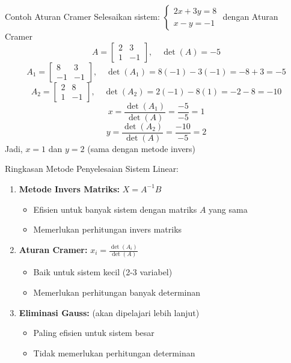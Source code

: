 \documentclass{beamer}
\begin{document}
\begin{frame}[t,fragile]{Contoh Aturan Cramer}
Selesaikan sistem: $\begin{cases} 2x + 3y = 8 \\ x - y = -1 \end{cases}$ dengan Aturan Cramer
\vspace{0.2cm}
$$ A = \begin{bmatrix} 2 & 3 \\ 1 & -1 \end{bmatrix}, \quad \det(A) = -5 $$
$$ A_1 = \begin{bmatrix} 8 & 3 \\ -1 & -1 \end{bmatrix}, \quad \det(A_1) = 8(-1) - 3(-1) = -8 + 3 = -5 $$
$$ A_2 = \begin{bmatrix} 2 & 8 \\ 1 & -1 \end{bmatrix}, \quad \det(A_2) = 2(-1) - 8(1) = -2 - 8 = -10 $$
$$ x = \frac{\det(A_1)}{\det(A)} = \frac{-5}{-5} = 1 $$
$$ y = \frac{\det(A_2)}{\det(A)} = \frac{-10}{-5} = 2 $$
Jadi, $x = 1$ dan $y = 2$ (sama dengan metode invers)
\end{frame}

\begin{frame}[t,fragile]{Ringkasan Metode Penyelesaian Sistem Linear:}
\begin{enumerate}
\item \textbf{Metode Invers Matriks:} $X = A^{-1}B$
    \begin{itemize}
    \item Efisien untuk banyak sistem dengan matriks $A$ yang sama
    \item Memerlukan perhitungan invers matriks
    \end{itemize}
\item \textbf{Aturan Cramer:} $x_i = \frac{\det(A_i)}{\det(A)}$
    \begin{itemize}
    \item Baik untuk sistem kecil (2-3 variabel)
    \item Memerlukan perhitungan banyak determinan
    \end{itemize}
\item \textbf{Eliminasi Gauss:} (akan dipelajari lebih lanjut)
    \begin{itemize}
    \item Paling efisien untuk sistem besar
    \item Tidak memerlukan perhitungan determinan
    \end{itemize}
\end{enumerate}
\end{frame}
\end{document}
